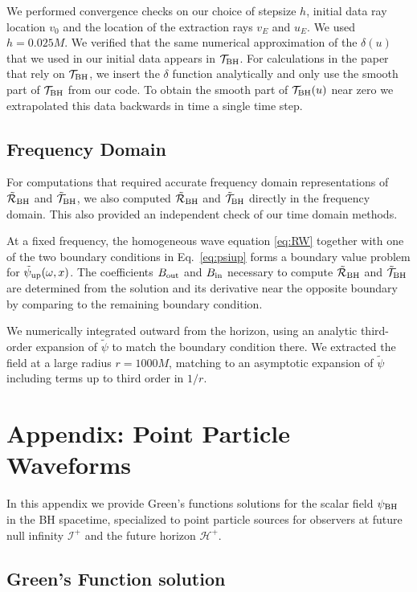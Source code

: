 \begin{refsection}
We performed convergence checks on our choice of stepsize $h$, initial data ray location $v_0$ and the location of the extraction rays $v_E$ and $u_E$. 
We used $h =0.025M$. 
We verified that the same numerical approximation of the $\delta(u)$ that we used in our initial data appears in $\mathcal T_{\rm BH}$. 
For calculations in the paper that rely on $\mathcal T_{\rm BH}$, we insert the $\delta$ function analytically and only use the smooth part of $\mathcal T_{\rm BH}$ from our code.
To obtain the smooth part of $\mathcal T_{\rm BH}(u)$ near zero we extrapolated this data backwards in time a single time step.

\subsection{Frequency Domain}

For computations that required accurate frequency domain representations of $\tilde{\mathcal R}_{\rm BH}$ and $\tilde{\mathcal T}_{\rm BH}$, we also computed  $\tilde{\mathcal R}_{\rm BH}$ and $\tilde{\mathcal T}_{\rm BH}$ directly in the frequency domain. This also provided an independent check of our time domain methods. 

At a fixed frequency, the homogeneous wave equation \eqref{eq:RW} together with one of the two boundary conditions in Eq.~\eqref{eq:psiup} forms a boundary value problem for  $\tilde \psi_{\rm up}(\omega, x)$. The coefficients $B_{\rm out}$ and $B_{\rm in}$ necessary to compute  $\tilde{\mathcal R}_{\rm BH}$ and $\tilde{\mathcal T}_{\rm BH}$ are determined from the solution and its derivative near the opposite boundary by comparing to the remaining boundary condition. 

We numerically integrated outward from the horizon, using an analytic third-order expansion of $\tilde \psi$ to match the boundary condition there.
We extracted the field at a large radius $r = 1000M$, matching to an asymptotic expansion of $\tilde \psi$ including terms up to third order in $1/r$.

\section{Appendix: Point Particle Waveforms}
\label{sec:Numerics}

In this appendix we provide Green's functions solutions for the scalar field $\psi_{\rm BH}$ in the BH spacetime, specialized to point particle sources for observers at future null infinity $\mathcal{I}^+$ and the future horizon $\mathcal{H}^+$.

\subsection{Green's Function solution}
\label{sec:GFsol}


\end{refsection}
